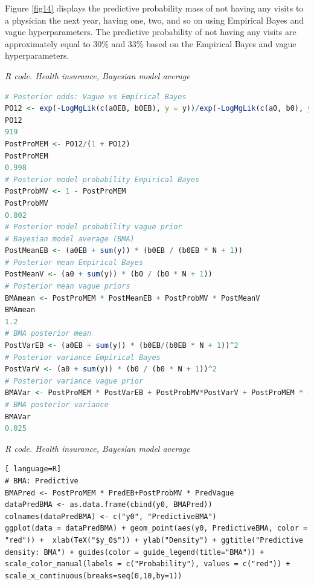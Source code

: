 Figure \ref{fig14} displays the predictive probability mass of not having any visits to a physician the next year, having one, two, and so on using Empirical Bayes and vague hyperparameters. The predictive probability of not having any visits are approximately equal to 30\% and 33\% based on the Empirical Bayes and vague hyperparameters. 

\begin{tcolorbox}[enhanced,width=4.67in,center upper,
	fontupper=\large\bfseries,drop shadow southwest,sharp corners]
\textit{R code. Health insurance, Bayesian model average}
\begin{VF}
\begin{lstlisting}[language=R]
# Posterior odds: Vague vs Empirical Bayes
PO12 <- exp(-LogMgLik(c(a0EB, b0EB), y = y))/exp(-LogMgLik(c(a0, b0), y = y))
PO12
919
PostProMEM <- PO12/(1 + PO12) 
PostProMEM
0.998
# Posterior model probability Empirical Bayes
PostProbMV <- 1 - PostProMEM 
PostProbMV
0.002
# Posterior model probability vague prior
# Bayesian model average (BMA)
PostMeanEB <- (a0EB + sum(y)) * (b0EB / (b0EB * N + 1)) 
# Posterior mean Empirical Bayes 
PostMeanV <- (a0 + sum(y)) * (b0 / (b0 * N + 1)) 
# Posterior mean vague priors
BMAmean <- PostProMEM * PostMeanEB + PostProbMV * PostMeanV  
BMAmean
1.2
# BMA posterior mean
PostVarEB <- (a0EB + sum(y)) * (b0EB/(b0EB * N + 1))^2 
# Posterior variance Empirical Bayes
PostVarV <- (a0 + sum(y)) * (b0 / (b0 * N + 1))^2 
# Posterior variance vague prior 
BMAVar <- PostProMEM * PostVarEB + PostProbMV*PostVarV + PostProMEM * (PostMeanEB - BMAmean)^2 + PostProbMV * (PostMeanV - BMAmean)^2
# BMA posterior variance   
BMAVar
0.025    
\end{lstlisting}
\end{VF}
\end{tcolorbox}

\begin{tcolorbox}[enhanced,width=4.67in,center upper,
	fontupper=\large\bfseries,drop shadow southwest,sharp corners]
	\textit{R code. Health insurance, Bayesian model average}
	\begin{VF}
		\begin{lstlisting}[ language=R]
# BMA: Predictive
BMAPred <- PostProMEM * PredEB+PostProbMV * PredVague
dataPredBMA <- as.data.frame(cbind(y0, BMAPred))
colnames(dataPredBMA) <- c("y0", "PredictiveBMA")
ggplot(data = dataPredBMA) + geom_point(aes(y0, PredictiveBMA, color = "red")) +  xlab(TeX("$y_0$")) + ylab("Density") + ggtitle("Predictive density: BMA") + guides(color = guide_legend(title="BMA")) + scale_color_manual(labels = c("Probability"), values = c("red")) + scale_x_continuous(breaks=seq(0,10,by=1)) 
		\end{lstlisting}
	\end{VF}
\end{tcolorbox}

